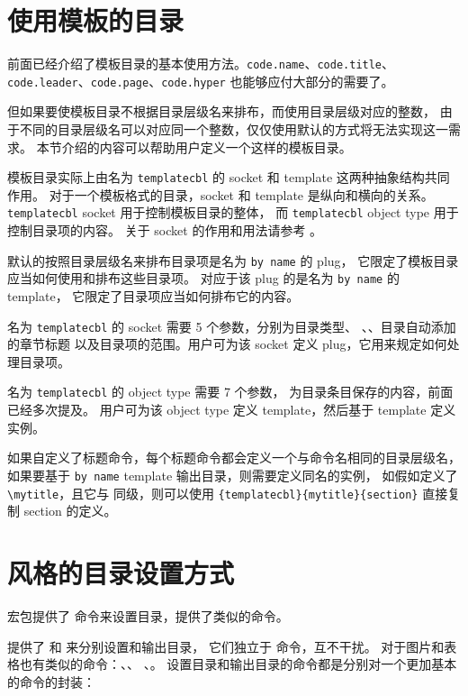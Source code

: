 \documentclass{cusdoc}
\begin{document}
\section{使用模板的目录}\label{sec:template-cbl}

前面已经介绍了模板目录的基本使用方法。\texttt{code.name}、\texttt{code.title}、
\texttt{code.leader}、\texttt{code.page}、\texttt{code.hyper} 也能够应付大部分的需要了。

但如果要使模板目录不根据目录层级名来排布，而使用目录层级对应的整数，
由于不同的目录层级名可以对应同一个整数，仅仅使用默认的方式将无法实现这一需求。
本节介绍的内容可以帮助用户定义一个这样的模板目录。

模板目录实际上由名为 \texttt{templatecbl} 的 socket 和 template 这两种抽象结构共同作用。
对于一个模板格式的目录，socket 和 template 是纵向和横向的关系。
\texttt{templatecbl} socket 用于控制模板目录的整体，
而 \texttt{templatecbl} object type 用于控制目录项的内容。
关于 socket 的作用和用法请参考 。

默认的按照目录层级名来排布目录项是名为 \verb|by name| 的 plug，
它限定了模板目录应当如何使用和排布这些目录项。
对应于该 plug 的是名为 \verb|by name| 的 template，
它限定了目录项应当如何排布它的内容。

名为 \texttt{templatecbl} 的 socket 需要 5 个参数，分别为目录类型、
、、目录自动添加的章节标题
以及目录项的范围。用户可为该 socket 定义 plug，它用来规定如何处理目录项。

名为 \texttt{templatecbl} 的 object type 需要 7 个参数，
为目录条目保存的内容，前面已经多次提及。
用户可为该 object type 定义 template，然后基于 template 定义实例。

如果自定义了标题命令，每个标题命令都会定义一个与命令名相同的目录层级名，
如果要基于 \texttt{by name} template 输出目录，则需要定义同名的实例，
如假如定义了 \verb|\mytitle|，且它与  同级，则可以使用
 \verb|{templatecbl}{mytitle}{section}| 
直接复制 section 的定义。


\section{风格的目录设置方式}

 宏包提供了  命令来设置目录，\CusTeX 提供了类似的命令。

\CusTeX 提供了  和  来分别设置和输出目录，
它们独立于  命令，互不干扰。
对于图片和表格也有类似的命令：、、
、。
设置目录和输出目录的命令都是分别对一个更加基本的命令的封装：
\begin{xample}
\newcommand{\tocsetstyle}{\SetSpecifiedCombinedListStyle[toc]}
\newcommand{\specifiedtoc}{\SpecifiedCombinedList[toc]}
\newcommand{\lofsetstyle}{\SetSpecifiedCombinedListStyle[lof]{figure}}
\newcommand{\specifiedlof}{\SpecifiedCombinedList[lof]}
\newcommand{\lotsetstyle}{\SetSpecifiedCombinedListStyle[lot]{table}}
\newcommand{\specifiedlot}{\SpecifiedCombinedList[lot]}
\stopxamplecode
\xamplecode \medskip
\end{xample}
\end{document}
